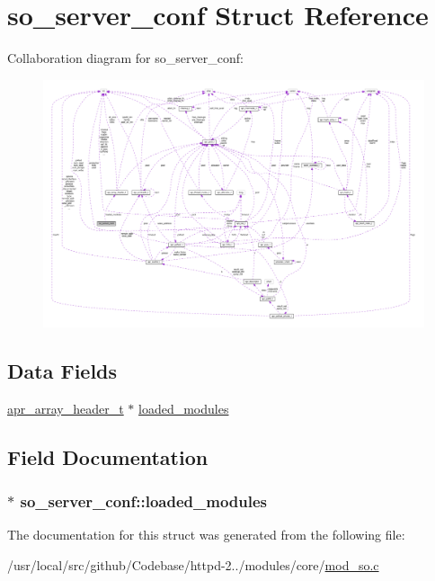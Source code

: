 \hypertarget{structso__server__conf}{}\section{so\+\_\+server\+\_\+conf Struct Reference}
\label{structso__server__conf}


Collaboration diagram for so\+\_\+server\+\_\+conf\+:
\nopagebreak
\begin{figure}[H]
\begin{center}
\leavevmode
\includegraphics[width=350pt]{structso__server__conf__coll__graph}
\end{center}
\end{figure}
\subsection*{Data Fields}
\begin{DoxyCompactItemize}
\item 
\hyperlink{structapr__array__header__t}{apr\+\_\+array\+\_\+header\+\_\+t} $\ast$ \hyperlink{structso__server__conf_a870d92d5fda4815fb2ef8e95a4e4adc9}{loaded\+\_\+modules}
\end{DoxyCompactItemize}


\subsection{Field Documentation}
\subsubsection[{\texorpdfstring{loaded\+\_\+modules}{loaded_modules}}]{$\ast$ so\+\_\+server\+\_\+conf\+::loaded\+\_\+modules}\hypertarget{structso__server__conf_a870d92d5fda4815fb2ef8e95a4e4adc9}{}\label{structso__server__conf_a870d92d5fda4815fb2ef8e95a4e4adc9}


The documentation for this struct was generated from the following file\+:\begin{DoxyCompactItemize}
\item 
/usr/local/src/github/\+Codebase/httpd-\/2../modules/core/\hyperlink{mod__so_8c}{mod\+\_\+so.\+c}\end{DoxyCompactItemize}
